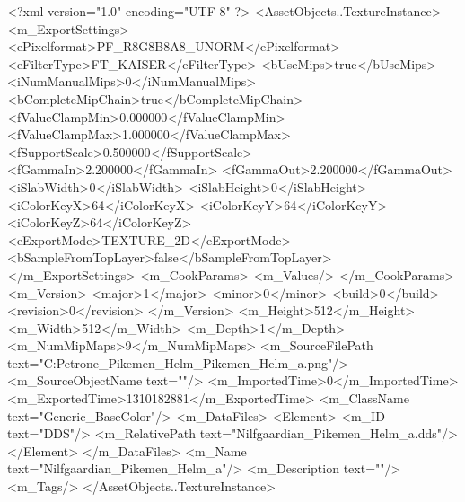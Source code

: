<?xml version="1.0" encoding="UTF-8" ?>
<AssetObjects..TextureInstance>
	<m_ExportSettings>
		<ePixelformat>PF_R8G8B8A8_UNORM</ePixelformat>
		<eFilterType>FT_KAISER</eFilterType>
		<bUseMips>true</bUseMips>
		<iNumManualMips>0</iNumManualMips>
		<bCompleteMipChain>true</bCompleteMipChain>
		<fValueClampMin>0.000000</fValueClampMin>
		<fValueClampMax>1.000000</fValueClampMax>
		<fSupportScale>0.500000</fSupportScale>
		<fGammaIn>2.200000</fGammaIn>
		<fGammaOut>2.200000</fGammaOut>
		<iSlabWidth>0</iSlabWidth>
		<iSlabHeight>0</iSlabHeight>
		<iColorKeyX>64</iColorKeyX>
		<iColorKeyY>64</iColorKeyY>
		<iColorKeyZ>64</iColorKeyZ>
		<eExportMode>TEXTURE_2D</eExportMode>
		<bSampleFromTopLayer>false</bSampleFromTopLayer>
	</m_ExportSettings>
	<m_CookParams>
		<m_Values/>
	</m_CookParams>
	<m_Version>
		<major>1</major>
		<minor>0</minor>
		<build>0</build>
		<revision>0</revision>
	</m_Version>
	<m_Height>512</m_Height>
	<m_Width>512</m_Width>
	<m_Depth>1</m_Depth>
	<m_NumMipMaps>9</m_NumMipMaps>
	<m_SourceFilePath text="C:\Users\Gabriele Petrone\Downloads\Nilfgaard\units\culture\Nilfgaardian_Pikemen_Helm\Nilfgaardian_Pikemen_Helm_a.png"/>
	<m_SourceObjectName text=""/>
	<m_ImportedTime>0</m_ImportedTime>
	<m_ExportedTime>1310182881</m_ExportedTime>
	<m_ClassName text="Generic_BaseColor"/>
	<m_DataFiles>
		<Element>
			<m_ID text="DDS"/>
			<m_RelativePath text="Nilfgaardian_Pikemen_Helm_a.dds"/>
		</Element>
	</m_DataFiles>
	<m_Name text="Nilfgaardian_Pikemen_Helm_a"/>
	<m_Description text=""/>
	<m_Tags/>
</AssetObjects..TextureInstance>

